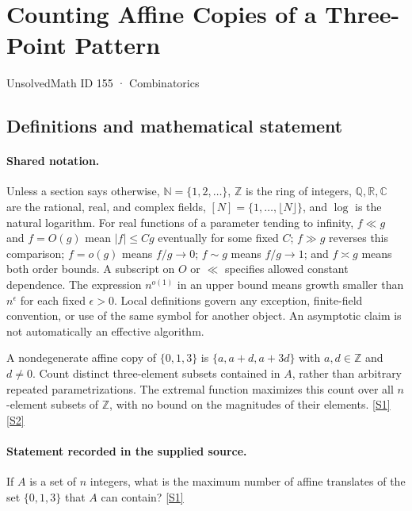 \documentclass[11pt,a4paper]{article}
\newcommand{\N}{\mathbb{N}}
\newcommand{\Z}{\mathbb{Z}}
\newcommand{\Q}{\mathbb{Q}}
\newcommand{\R}{\mathbb{R}}
\newcommand{\C}{\mathbb{C}}
\newcommand{\sref}[2]{\hyperlink{source:#1:#2}{[S#2]}}
\begin{document}

\setcounter{section}{154}

\section{Counting Affine Copies of a Three-Point Pattern}\label{155}

{\small\sffamily UnsolvedMath ID 155 · Combinatorics}

\subsection{Definitions and mathematical statement}

\paragraph{Shared notation.}Unless a section says otherwise, $\N=\{1,2,\ldots\}$,
$\Z$ is the ring of integers, $\Q,\R,\C$ are the rational, real, and complex
fields, $[N]=\{1,\ldots,\lfloor N\rfloor\}$, and $\log$ is the natural
logarithm. For real functions of a parameter tending to infinity,
$f\ll g$ and $f=O(g)$ mean $|f|\leq Cg$ eventually for some fixed $C$;
$f\gg g$ reverses this comparison; $f=o(g)$ means $f/g\to0$;
$f\sim g$ means $f/g\to1$; and $f\asymp g$ means both order bounds.
A subscript on $O$ or $\ll$ specifies allowed constant dependence.
The expression $n^{o(1)}$ in an upper bound means growth smaller than
$n^\epsilon$ for each fixed $\epsilon>0$. Local definitions govern any
exception, finite-field convention, or use of the same symbol for another
object. An asymptotic claim is not automatically an effective algorithm.



A nondegenerate affine copy of $\{0,1,3\}$ is $\{a,a+d,a+3d\}$ with $a,d\in\Z$ and $d\ne0$. Count distinct three-element subsets contained in $A$, rather than arbitrary repeated parametrizations. The extremal function maximizes this count over all $n$-element subsets of $\Z$, with no bound on the magnitudes of their elements. \sref{155}{1} \sref{155}{2}

\paragraph{Statement recorded in the supplied source.}
If $A$ is a set of $n$ integers, what is the maximum number of affine translates of the set $\{0, 1, 3\}$ that $A$ can contain? \sref{155}{1}
\end{document}
